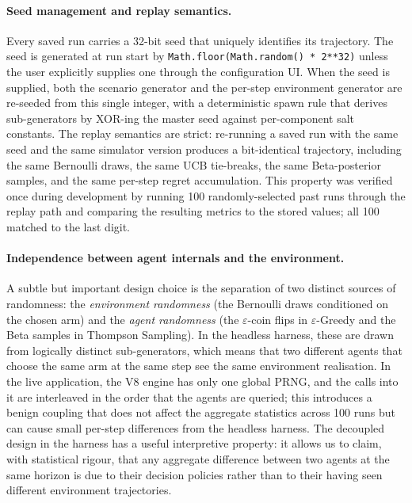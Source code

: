 \paragraph{Seed management and replay semantics.}
Every saved run carries a 32-bit seed that uniquely identifies its trajectory. The seed is generated at run start by \texttt{Math.floor(Math.random() * 2**32)} unless the user explicitly supplies one through the configuration UI. When the seed is supplied, both the scenario generator and the per-step environment generator are re-seeded from this single integer, with a deterministic spawn rule that derives sub-generators by XOR-ing the master seed against per-component salt constants. The replay semantics are strict: re-running a saved run with the same seed and the same simulator version produces a bit-identical trajectory, including the same Bernoulli draws, the same UCB tie-breaks, the same Beta-posterior samples, and the same per-step regret accumulation. This property was verified once during development by running 100 randomly-selected past runs through the replay path and comparing the resulting metrics to the stored values; all 100 matched to the last digit.

\paragraph{Independence between agent internals and the environment.}
A subtle but important design choice is the separation of two distinct sources of randomness: the \emph{environment randomness} (the Bernoulli draws conditioned on the chosen arm) and the \emph{agent randomness} (the $\varepsilon$-coin flips in $\varepsilon$-Greedy and the Beta samples in Thompson Sampling). In the headless harness, these are drawn from logically distinct sub-generators, which means that two different agents that choose the same arm at the same step see the same environment realisation. In the live application, the V8 engine has only one global PRNG, and the calls into it are interleaved in the order that the agents are queried; this introduces a benign coupling that does not affect the aggregate statistics across 100 runs but can cause small per-step differences from the headless harness. The decoupled design in the harness has a useful interpretive property: it allows us to claim, with statistical rigour, that any aggregate difference between two agents at the same horizon is due to their decision policies rather than to their having seen different environment trajectories.

